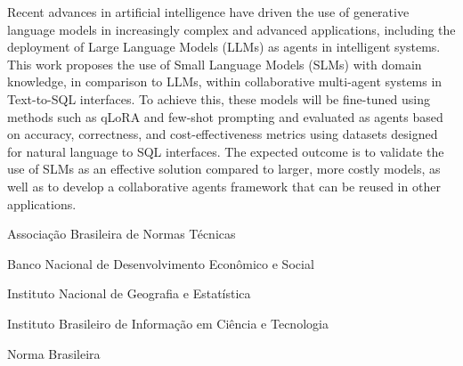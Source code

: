 \documentclass[
	12pt,				%
	openright,			%
	oneside,			%
	a4paper,			%
	dissertacao,			%
	]{ABNT-DC-UEL}
\begin{document}
\begin{Abstract}
  Recent advances in artificial intelligence have driven the use of generative language models in increasingly complex and advanced applications, including the deployment of Large Language Models (LLMs) as agents in intelligent systems. This work proposes the use of Small Language Models (SLMs) with domain knowledge, in comparison to LLMs, within collaborative multi-agent systems in Text-to-SQL interfaces. To achieve this, these models will be fine-tuned using methods such as qLoRA and few-shot prompting and evaluated as agents based on accuracy, correctness, and cost-effectiveness metrics using datasets designed for natural language to SQL interfaces. The expected outcome is to validate the use of SLMs as an effective solution compared to larger, more costly models, as well as to develop a collaborative agents framework that can be reused in other applications.
\end{Abstract}

\listoffigures*
\cleardoublepage

\listoftables*
\cleardoublepage

\begin{siglas}
  \item[ABNT] Associação Brasileira de Normas Técnicas
  \item[BNDES] Banco Nacional de Desenvolvimento Econômico e Social
  \item[IBGE] Instituto Nacional de Geografia e Estatística
  \item[IBICT] Instituto Brasileiro de Informação em Ciência e Tecnologia
  \item[NBR] Norma Brasileira
\end{siglas}

\end{document}
